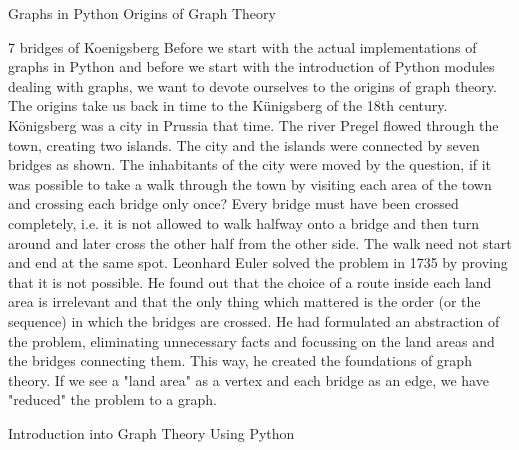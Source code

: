 Graphs in Python
Origins of Graph Theory

7 bridges of Koenigsberg Before we start with the actual implementations of graphs in Python and before we start with the introduction of Python modules dealing with graphs, we want to devote ourselves to the origins of graph theory. 
The origins take us back in time to the Künigsberg of the 18th century. Königsberg was a city in Prussia that time. The river Pregel flowed through the town, creating two islands. The city and the islands were connected by seven bridges as shown. The inhabitants of the city were moved by the question, if it was possible to take a walk through the town by visiting each area of the town and crossing each bridge only once? Every bridge must have been crossed completely, i.e. it is not allowed to walk halfway onto a bridge and then turn around and later cross the other half from the other side. The walk need not start and end at the same spot. Leonhard Euler solved the problem in 1735 by proving that it is not possible. He found out that the choice of a route inside each land area is irrelevant and that the only thing which mattered is the order (or the sequence) in which the bridges are crossed. He had formulated an abstraction of the problem, eliminating unnecessary facts and focussing on the land areas and the bridges connecting them. This way, he created the foundations of graph theory. If we see a "land area" as a vertex and each bridge as an edge, we have "reduced" the problem to a graph. 

Introduction into Graph Theory Using Python

